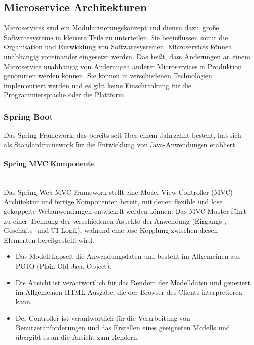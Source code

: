 \subsection{Microservice Architekturen}

Microservices sind ein Modularisierungskonzept und dienen dazu, große Softwaresysteme in kleinere Teile zu unterteilen. Sie beeinflussen somit die Organisation und Entwicklung von Softwaresystemen. Microservices können unabhängig voneinander eingesetzt werden. Das heißt, dass Änderungen an einem Microservice unabhängig von Änderungen anderer Microservices in Produktion genommen werden können. Sie können in verschiedenen Technologien implementiert werden und es gibt keine Einschränkung für die Programmiersprache oder die Plattform\cite[45--46]{wolff2016microservices}.

\subsubsection{Spring Boot}

Das Spring-Framework, das bereits seit über einem Jahrzehnt besteht, hat sich als Standardframework für die Entwicklung von Java-Anwendungen etabliert.

\paragraph{Spring MVC Komponente}\mbox{}\\

Das Spring-Web-MVC-Framework stellt eine Model-View-Controller (MVC)-Architektur und fertige Komponenten bereit, mit denen flexible und lose gekoppelte Webanwendungen entwickelt werden können. Das MVC-Muster führt zu einer Trennung der verschiedenen Aspekte der Anwendung (Eingangs-, Geschäfts- und UI-Logik), während eine lose Kopplung zwischen diesen Elementen bereitgestellt wird\cite{tp12mvc}.

\begin{itemize}
	\item Das Modell kapselt die Anwendungsdaten und besteht im Allgemeinen aus POJO (Plain Old Java Object).
	\item Die Ansicht ist verantwortlich für das Rendern der Modelldaten und generiert im Allgemeinen HTML-Ausgabe, die der Browser des Clients interpretieren kann.
	\item Der Controller ist verantwortlich für die Verarbeitung von Benutzeranforderungen und das Erstellen eines geeigneten Modells und übergibt es an die Ansicht zum Rendern.
\end{itemize}

